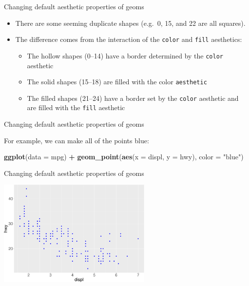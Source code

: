 \documentclass[ignorenonframetext,]{beamer}
\newenvironment{Shaded}{\begin{snugshade}}{\end{snugshade}}
\newcommand{\DataTypeTok}[1]{\textcolor[rgb]{0.13,0.29,0.53}{#1}}
\newcommand{\KeywordTok}[1]{\textcolor[rgb]{0.13,0.29,0.53}{\textbf{#1}}}
\newcommand{\NormalTok}[1]{#1}
\newcommand{\OperatorTok}[1]{\textcolor[rgb]{0.81,0.36,0.00}{\textbf{#1}}}
\newcommand{\StringTok}[1]{\textcolor[rgb]{0.31,0.60,0.02}{#1}}
\begin{document}
\begin{frame}[fragile]{Changing default aesthetic properties of geoms}
\protect\hypertarget{changing-default-aesthetic-properties-of-geoms-1}{}

\begin{itemize}
\item
  There are some seeming duplicate shapes (e.g.~0, 15, and 22 are all
  squares).
\item
  The difference comes from the interaction of the \texttt{color} and
  \texttt{fill} aesthetics:

  \begin{itemize}
  \item
    The hollow shapes (0--14) have a border determined by the
    \texttt{color} aesthetic
  \item
    The solid shapes (15--18) are filled with the color
    \texttt{aesthetic}
  \item
    The filled shapes (21--24) have a border set by the \texttt{color}
    aesthetic and are filled with the \texttt{fill} aesthetic
  \end{itemize}
\end{itemize}

\end{frame}

\begin{frame}[fragile]{Changing default aesthetic properties of geoms}
\protect\hypertarget{changing-default-aesthetic-properties-of-geoms-2}{}

For example, we can make all of the points blue:

\begin{Shaded}
\begin{Highlighting}[]
\KeywordTok{ggplot}\NormalTok{(}\DataTypeTok{data =}\NormalTok{ mpg) }\OperatorTok{+}
\StringTok{  }\KeywordTok{geom_point}\NormalTok{(}\KeywordTok{aes}\NormalTok{(}\DataTypeTok{x =}\NormalTok{ displ, }\DataTypeTok{y =}\NormalTok{ hwy), }
    \DataTypeTok{color =} \StringTok{"blue"}\NormalTok{)}
\end{Highlighting}
\end{Shaded}

\end{frame}

\begin{frame}{Changing default aesthetic properties of geoms}
\protect\hypertarget{changing-default-aesthetic-properties-of-geoms-3}{}

\begin{center}\includegraphics[height=200px]{data-visualization_files/figure-beamer/unnamed-chunk-39-1} \end{center}

\end{frame}
\end{document}
